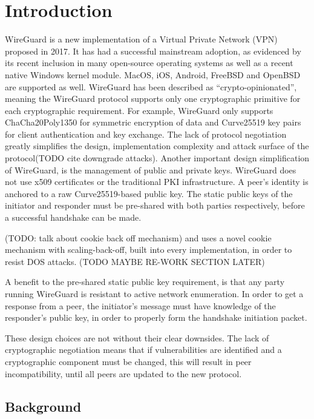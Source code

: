 \documentclass [11pt, proquest] {uwthesis}[2020/02/24]
\begin{document}
\textpages

\chapter {Introduction}
WireGuard is a new implementation of a Virtual Private Network (VPN) proposed in 2017. It has had a successful mainstream adoption, as evidenced by its recent inclusion in many open-source operating systems\cite{donenfeld_wireguard_nodate} as well as a recent native Windows kernel module\cite{noauthor_wireguard-nt_nodate}. MacOS, iOS, Android, FreeBSD and OpenBSD are supported as well.
WireGuard has been described as “crypto-opinionated”, meaning the WireGuard protocol supports only one cryptographic primitive for each cryptographic requirement.
For example, WireGuard only supports ChaCha20Poly1350 for symmetric 
encryption\cite{donenfeld_wireguard_2017} of data and Curve25519 key pairs for client authentication and key exchange.
The lack of protocol negotiation greatly simplifies the design, implementation complexity and attack surface of the protocol(TODO cite downgrade attacks). Another important design simplification of WireGuard, is the management of public and private keys. WireGuard does not use x509 certificates or the traditional PKI infrastructure. A peer's identity is anchored to a raw Curve25519-based public key. 
The static public keys of the initiator and responder must be pre-shared with both parties respectively, before a successful handshake can be made. 

(TODO: talk about cookie back off mechanism) and uses a novel cookie mechanism with scaling-back-off, built into every implementation, in order to resist DOS attacks. (TODO MAYBE RE-WORK SECTION LATER)

A benefit to the pre-shared static public key requirement, is that any party running WireGuard is resistant to active network enumeration. In order to get a response from a peer, the initiator's message must have knowledge of the responder's public key, in order to properly form the handshake initiation packet. 

These design choices are not without their clear downsides. The lack of cryptographic negotiation means that if vulnerabilities are identified and a cryptographic component must be changed, this will result in peer incompatibility, until all peers are updated to the new protocol.


\section {Background}
\end{document}
